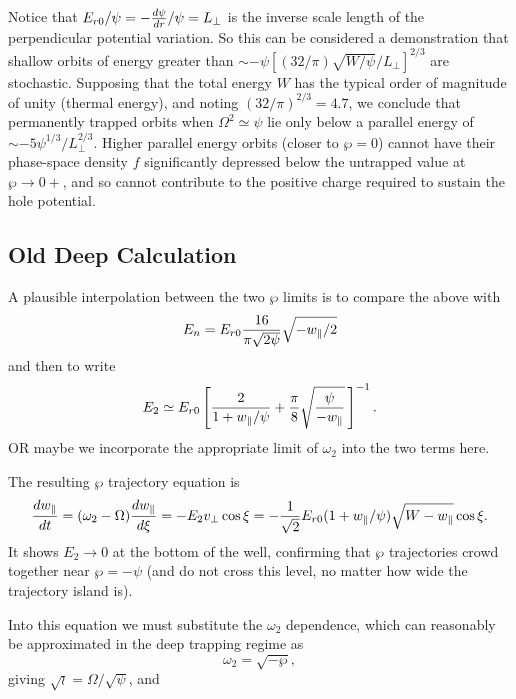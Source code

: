 Notice that $E_{r0}/\psi=-{d\psi\over dr}/\psi=L_\perp$ is the inverse
scale length of the perpendicular potential variation. So this can be
considered a demonstration that shallow orbits of energy greater than
$\sim-\psi [(32/\pi)\sqrt{W/\psi}/L_\perp]^{2/3}$ are
stochastic. Supposing that the total energy $W$ has the typical order
of magnitude of unity (thermal energy), and noting
$(32/\pi)^{2/3}=4.7$, we conclude that permanently trapped orbits when
$\Omega^2\simeq\psi$ lie only below a parallel energy of
$\sim -5 \psi^{1/3}/L_\perp^{2/3}$.  Higher parallel energy orbits
(closer to $\wp=0$) cannot have their phase-space density $f$
significantly depressed below the untrapped value at
$\wp \to 0+$, and so cannot contribute to the positive charge
required to sustain the hole potential.

\subsection{Old Deep Calculation}

A plausible interpolation between the two $\wp$ limits is to 
compare the above with
\begin{equation}
  \label{eq:E2int}
  E_n= E_{r0}{16\over
    \pi\sqrt{2\psi}}\sqrt{-\wp/2}
\end{equation}
and then to write
\begin{equation}
  \label{eq:E2int2}
  E_2\simeq E_{r0}
  \left[
    {2\over 1+\wp/\psi}+ 
    {\pi\over 8}\sqrt{\psi\over -\wp}\,
  \right]^{-1}.
\end{equation}
OR maybe we incorporate the appropriate limit of $\omega_2$ into the
two terms here.

The resulting $\wp$ trajectory equation is
\begin{equation}
  \label{eq:deeptraj}
  {d\wp \over dt}=  (\omega_2-\Omega){d\wp \over d\xi}
  =-E_2 v_\perp \cos\xi 
  =-{1\over\sqrt{2}}E_{r0}(1+\wp/\psi)\sqrt{W-\wp}\cos\xi . 
\end{equation}
It shows $E _2\to 0$ at
the bottom of the well, confirming that $\wp$ trajectories crowd
together near $\wp=-\psi$ (and do not cross this level, no
matter how wide the trajectory island is). 


Into this equation we must substitute the $\omega_2$ dependence, which
can reasonably be approximated in the deep trapping regime as 
\begin{equation}
  \label{eq:omegadeep}
  \omega_2=\sqrt{-\wp},
\end{equation}
giving $\sqrt{\wr }=\Omega/\sqrt\psi$, and

